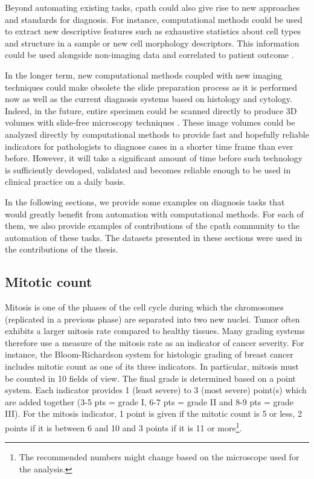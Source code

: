 Beyond automating existing tasks, \acrlong{cpath} could also give rise to new approaches and standards for diagnosis. For instance, computational methods could be used to extract new descriptive features such as exhaustive statistics about cell types and structure in a sample or new cell morphology descriptors. This information could be used alongside non-imaging data and correlated to patient outcome \cite{abels2019computational}. 

In the longer term, new computational methods coupled with new imaging techniques could make obsolete the slide preparation process as it is performed now as well as the current diagnosis systems based on histology and cytology. Indeed, in the future, entire specimen could be scanned directly to produce 3D volumes with slide-free microscopy techniques \cite{np2017histopathology, liu2021slide}. These image volumes could be analyzed directly by computational methods to provide fast and hopefully reliable indicators for pathologists to diagnose cases in a shorter time frame than ever before. However, it will take a significant amount of time before such technology is sufficiently developed, validated and becomes reliable enough to be used in clinical practice on a daily basis. 

In the following sections, we provide some examples on diagnosis tasks that would greatly benefit from automation with computational methods. For each of them, we also provide examples of contributions of the \acrlong{cpath} community to the automation of these tasks. The datasets presented in these sections were used in the contributions of the thesis. 

\subsection{Mitotic count}
\label{ssec:backdp:analysis_mitotic_count}

Mitosis is one of the phases of the cell cycle during which the chromosomes (replicated in a previous phase) are separated into two new nuclei. Tumor often exhibits a larger mitosis rate compared to healthy tissues. Many grading systems therefore use a measure of the mitosis rate as an indicator of cancer severity. For instance, the Bloom-Richardson system \cite{roychowdhury2022bloomrichardson} for histologic grading of breast cancer includes mitotic count as one of its three indicators. In particular, mitosis must be counted in 10 fields of view. The final grade is determined based on a point system. Each indicator provides 1 (least severe) to 3 (most severe) point(s) which are added together (3-5 pts = grade I, 6-7 pts = grade II and 8-9 pts = grade III). For the mitosis indicator, 1 point is given if the mitotic count is 5 or less, 2 points if it is between 6 and 10 and 3 points if it is 11 or more\footnote{The recommended numbers might change based on the microscope used for the analysis.}. 

